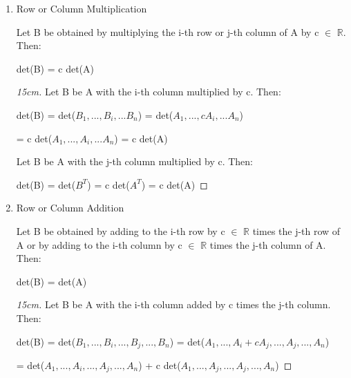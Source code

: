     \begin{enumerate}[label=(\alph*), leftmargin=2cm, itemsep=0.1cm]
        \item {\color{lgreen} Row or Column Multiplication}

            Let B be obtained by multiplying the i-th row or j-th column
            of A by c $\in$ $\mathbb{R}$. Then:

            \hspace{0.5cm}
            det(B) = c det(A)

            \begin{proof}[15cm]
                Let B be A with the i-th column multiplied by c. Then:
                
                \hspace{0.5cm}
                det(B)
                = det($B_1,...,B_i,...B_n$)
                = det($A_1,...,cA_i,...A_n$)

                \hspace{1.8cm}
                = c det($A_1,...,A_i,...A_n$)
                = c det(A)

                Let B be A with the j-th column multiplied by c. Then:

                \hspace{0.5cm}
                det(B)
                = det($B^T$)
                = c det($A^T$)
                = c det(A)
            \end{proof}

        \item {\color{lgreen} Row or Column Addition}
        
            Let B be obtained by adding to the i-th row by c $\in$ $\mathbb{R}$
            times the j-th row of A or by adding to the i-th column by
            c $\in$ $\mathbb{R}$ times the j-th column of A. Then:

            \hspace{0.5cm}
            det(B) = det(A)
            
            \begin{proof}[15cm]
                Let B be A with the i-th column added by c times the j-th column.
                Then:
                
                \hspace{0.5cm}
                det(B)
                = det($B_1,...,B_i,...,B_j,...,B_n$)
                = det($A_1,...,A_i+cA_j,...,A_j,...,A_n$)

                \hspace{1.8cm}
                = det($A_1,...,A_i,...,A_j,...,A_n$)
                    + c det($A_1,...,A_j,...,A_j,...,A_n$)


\end{proof}
\end{enumerate}
